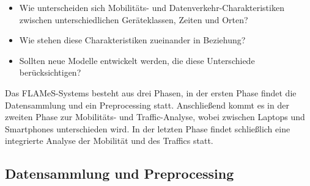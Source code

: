 \documentclass[12pt, a4paper]{article}
\begin{document}
\begin{itemize}
    \item Wie unterscheiden sich Mobilitäts- und Datenverkehr-Charakteristiken zwischen unterschiedlichen Geräteklassen,
    Zeiten und Orten?
    \item Wie stehen diese Charakteristiken zueinander in Beziehung?
    \item Sollten neue Modelle entwickelt werden, die diese Unterschiede berücksichtigen?
\end{itemize}

Das FLAMeS-Systems besteht aus drei Phasen, in der ersten Phase findet die Datensammlung und ein Preprocessing statt.
Anschließend kommt es in der zweiten Phase zur Mobilitäts- und Traffic-Analyse, wobei zwischen Laptops und Smartphones
unterschieden wird. In der letzten Phase findet schließlich eine integrierte Analyse der Mobilität und des Traffics statt.

\subsection{Datensammlung und Preprocessing}
\end{document}
